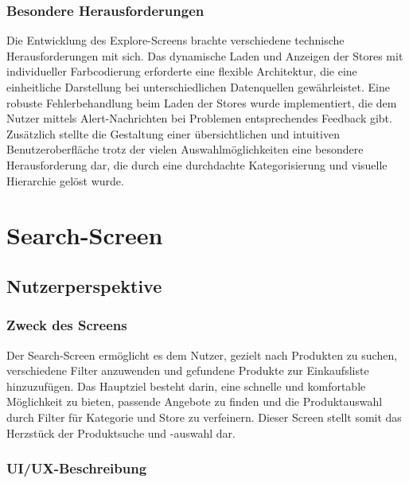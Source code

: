 \documentclass[12pt, a4paper]{report} %
\begin{document}
\subsubsection{Besondere Herausforderungen}
Die Entwicklung des Explore-Screens brachte verschiedene technische Herausforderungen mit sich. Das dynamische Laden und Anzeigen der Stores mit individueller Farbcodierung erforderte eine flexible Architektur, die eine einheitliche Darstellung bei unterschiedlichen Datenquellen gewährleistet. Eine robuste Fehlerbehandlung beim Laden der Stores wurde implementiert, die dem Nutzer mittels Alert-Nachrichten bei Problemen entsprechendes Feedback gibt. Zusätzlich stellte die Gestaltung einer übersichtlichen und intuitiven Benutzeroberfläche trotz der vielen Auswahlmöglichkeiten eine besondere Herausforderung dar, die durch eine durchdachte Kategorisierung und visuelle Hierarchie gelöst wurde.

\section{Search-Screen}
\label{sec:search_screen}

\subsection{Nutzerperspektive}

\subsubsection{Zweck des Screens}
Der Search-Screen ermöglicht es dem Nutzer, gezielt nach Produkten zu suchen, verschiedene Filter anzuwenden und gefundene Produkte zur Einkaufsliste hinzuzufügen. Das Hauptziel besteht darin, eine schnelle und komfortable Möglichkeit zu bieten, passende Angebote zu finden und die Produktauswahl durch Filter für Kategorie und Store zu verfeinern. Dieser Screen stellt somit das Herzstück der Produktsuche und -auswahl dar.

\subsubsection{UI/UX-Beschreibung}
\end{document}
